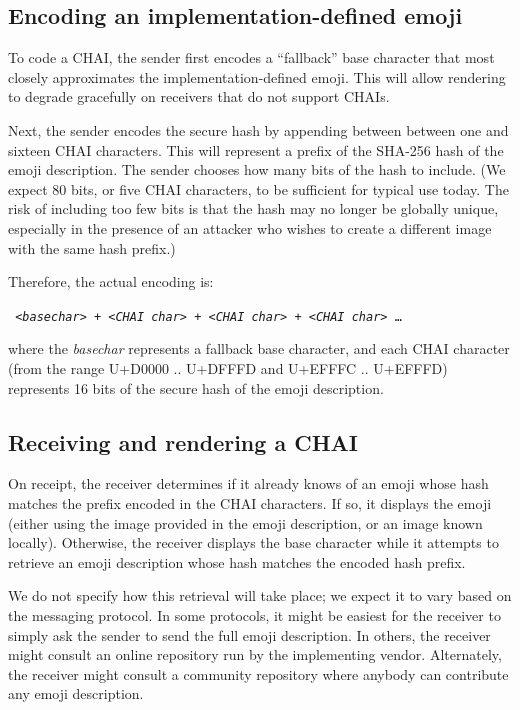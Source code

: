 \documentclass[12pt]{article}
\begin{document}
\subsection{Encoding an implementation-defined emoji}

To code a CHAI, the sender first encodes a ``fallback'' base character
that most closely approximates the implementation-defined emoji. This
will allow rendering to degrade gracefully on receivers that do not
support CHAIs.

Next, the sender encodes the secure hash by appending between between
one and sixteen CHAI characters. This will represent a prefix of the
SHA-256 hash of the emoji description. The sender chooses how many
bits of the hash to include. (We expect 80 bits, or five CHAI
characters, to be sufficient for typical use today. The risk of
including too few bits is that the hash may no longer be globally unique,
especially in the presence of an attacker who wishes to create a different
image with the same hash prefix.)

Therefore, the actual encoding is:

\texttt { <\textit{basechar}> + <\textit{CHAI char}> + <\textit{CHAI char}> + <\textit{CHAI char}> \ldots }

where the \textit{basechar} represents a fallback base character, and
each CHAI character (from the range U+D0000 .. U+DFFFD and U+EFFFC
.. U+EFFFD) represents 16 bits of the secure hash of the emoji
description.

\subsection{Receiving and rendering a CHAI}

On receipt, the receiver determines if it already knows of an emoji
whose hash matches the prefix encoded in the CHAI characters. If so,
it displays the emoji (either using the image provided in the emoji
description, or an image known locally). Otherwise, the receiver
displays the base character while it attempts to retrieve an emoji
description whose hash matches the encoded hash prefix.

We do not specify how this retrieval will take place; we expect it to
vary based on the messaging protocol. In some protocols, it might be
easiest for the receiver to simply ask the sender to send the full
emoji description. In others, the receiver might consult an online
repository run by the implementing vendor. Alternately, the receiver
might consult a community repository where anybody can contribute any
emoji description.
\end{document}
